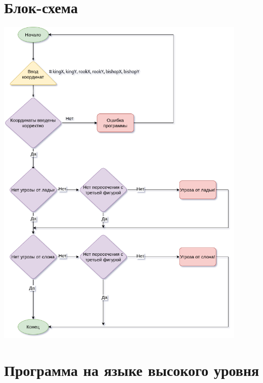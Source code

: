 \documentclass{article}
\begin{document}
\section{Блок-схема}

\begin{center}
    \centering
    \includegraphics[width=0.9\textwidth]{chess_block_schema.drawio.png}
    \label{fig:chess block schema}

\end{center}

\newpage
\section{Программа на языке высокого уровня}
\end{document}
